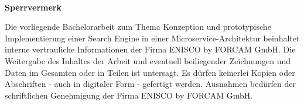 
~

\vspace{17.1mm}

\begin{flushleft}
    \textbf{\huge{}Sperrvermerk}{\huge\par}
\par\end{flushleft}
Die vorliegende Bachelorarbeit zum Thema \glqq Konzeption und prototypische Implementierung einer Search Engine in einer Microservice-Architektur\grqq{} beinhaltet interne vertrauliche Informationen der Firma ENISCO by FORCAM GmbH. Die Weitergabe des Inhaltes der Arbeit und eventuell beiliegender Zeichnungen und Daten im Gesamten oder in Teilen ist untersagt. Es dürfen keinerlei Kopien oder Abschriften - auch in digitaler Form - gefertigt werden. Ausnahmen bedürfen der schriftlichen Genehmigung der Firma ENISCO by FORCAM GmbH.